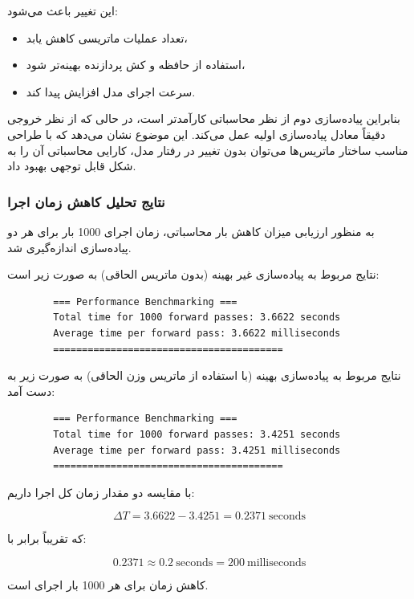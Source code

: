 \documentclass{article}
\begin{document}
این تغییر باعث می‌شود:
\begin{itemize}
	\item تعداد عملیات ماتریسی کاهش یابد،
	\item استفاده از حافظه و کش پردازنده بهینه‌تر شود،
	\item سرعت اجرای مدل افزایش پیدا کند.
\end{itemize}

بنابراین پیاده‌سازی دوم از نظر محاسباتی کارآمدتر است، در حالی که از نظر خروجی دقیقاً معادل پیاده‌سازی اولیه عمل می‌کند. این موضوع نشان می‌دهد که با طراحی مناسب ساختار ماتریس‌ها می‌توان بدون تغییر در رفتار مدل، کارایی محاسباتی آن را به شکل قابل توجهی بهبود داد.
\subsubsection{نتایج تحلیل کاهش زمان اجرا}

به منظور ارزیابی میزان کاهش بار محاسباتی، زمان اجرای 1000 بار  برای هر دو پیاده‌سازی اندازه‌گیری شد.

نتایج مربوط به پیاده‌سازی غیر بهینه (بدون ماتریس الحاقی) به صورت زیر است:

\begin{LTR}
	\begin{verbatim}
		=== Performance Benchmarking ===
		Total time for 1000 forward passes: 3.6622 seconds
		Average time per forward pass: 3.6622 milliseconds
		========================================
	\end{verbatim}
\end{LTR}

نتایج مربوط به پیاده‌سازی بهینه (با استفاده از ماتریس وزن الحاقی) به صورت زیر به دست آمد:

\begin{LTR}
	\begin{verbatim}
		=== Performance Benchmarking ===
		Total time for 1000 forward passes: 3.4251 seconds
		Average time per forward pass: 3.4251 milliseconds
		========================================
	\end{verbatim}
\end{LTR}

با مقایسه دو مقدار زمان کل اجرا داریم:

\[
\Delta T = 3.6622 - 3.4251 = 0.2371 \ \text{seconds}
\]

که تقریباً برابر با:

\[
0.2371 \approx 0.2 \ \text{seconds} = 200 \ \text{milliseconds}
\]

کاهش زمان برای هر 1000 بار اجرای  است.
\end{document}
